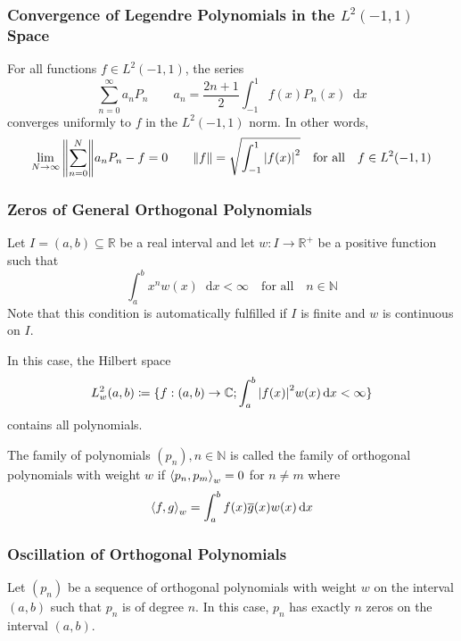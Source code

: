 \documentclass[11pt, a4paper]{article}
\newcommand{\diff}{\mathop{}\!\mathrm{d}} %
\newcommand{\R}{\mathbb{R}} %
\newcommand{\C}{\mathbb{C}} %
\begin{document}
\subsubsection{Convergence of Legendre Polynomials in the $ L^2(-1, 1) $ Space}
For all functions $ f \in L^2(-1, 1) $, the series
\begin{equation*}
	\sum_{n=0}^{\infty}a_nP_n \qquad a_n = \frac{2n+1}{2}\int_{-1}^{1}f(x)P_n(x) \diff x
\end{equation*}
converges uniformly to $ f $ in the $ L^2(-1, 1) $ norm. In other words,
\begin{equation*}
	\lim_{N\to \infty}\norm{\sum_{n=0}^{N}}a_n P_n - f = 0 \qquad \norm{f} = \sqrt{\int_{-1}^{1} \abs{f(x)}^2} \quad \text{for all} \quad f \in L^2(-1, 1)
\end{equation*}

\subsubsection{Zeros of General Orthogonal Polynomials}
Let $ I = (a, b) \subseteq \R $ be a real interval and let $ w : I \to \R^+ $ be a positive function such that
\begin{equation*}
	\int_{a}^{b} x^n w(x) \diff x < \infty \quad \text{for all} \quad n \in \mathbb{N}
\end{equation*}
Note that this condition is automatically fulfilled if $ I $ is finite and $ w $ is continuous on $ I $.

In this case, the Hilbert space
\begin{equation*}
	L_{w}^2(a, b) \coloneqq \{f : (a, b) \to \C; \int_{a}^{b}\abs{f(x)}^2 w(x)\diff x < \infty \}
\end{equation*}
contains all polynomials. 

The family of polynomials $ (p_n), n \in \mathbb{N} $ is called the family of orthogonal polynomials with weight $ w $ if $ \expval{p_n, p_m}_{w} = 0 $ for $ n \neq m $ where
\begin{equation*}
	\expval{f, g}_{w} = \int_{a}^{b} f(x) \overline{g}(x)w(x) \diff x
\end{equation*}

\subsubsection{Oscillation of Orthogonal Polynomials}
Let $ (p_n) $ be a sequence of orthogonal polynomials with weight $ w $ on the interval $ (a, b) $ such that $ p_n $ is of degree $ n $. In this case, $ p_n $ has exactly $ n $ zeros on the interval $ (a, b) $.
\end{document}
